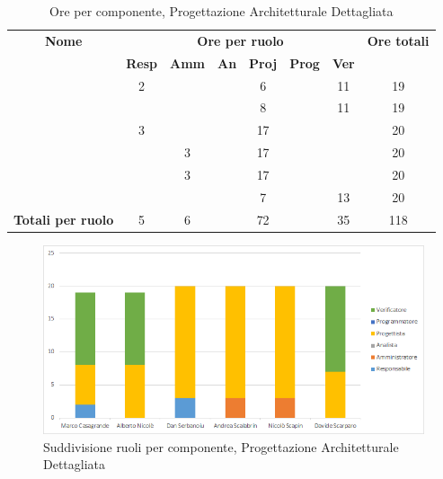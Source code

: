 \begin{table}[H]
	\begin{center}
		\begin{tabular}{|c|c|c|c|c|c|c|c|}
			\hline
			\textbf{Nome} & \multicolumn{6}{c|}{\textbf{Ore per ruolo}} & \textbf{Ore totali} \\\cline{2-7}
			& \textbf{Resp} & \textbf{Amm} & \textbf{An} & \textbf{Proj} & \textbf{Prog} & \textbf{Ver} & \\
			\hline
			\MC			&	2	&		&		&	6	&		&	11	&	19	\\
			\hline
			\AN			&		&		&		&	8	&   	&	11	& 	19	\\
			\hline
			\DAN		&	3	&		&		&	17	&		&		&	20	\\
			\hline
			\AS			&		&	3	&	 	&	17	&	 	& 		&	20	\\
			\hline
			\NS 		&		&	3	&		&	17	&		& 		&	20	\\
			\hline
			\DS			& 		&		&		&	7	&		&	13	&	20	\\
			\hline
			\textbf{Totali per ruolo}	& 	5	&	6	&		&  72	&		&	35	&	118	\\
			\hline
		\end{tabular}
	\end{center}
	\caption{Ore per componente, Progettazione Architetturale Dettagliata}
\end{table}

\begin{figure}[H]
	\centering
	\includegraphics[scale=0.6]{img/6-3.png}
	\caption{Suddivisione ruoli per componente, Progettazione Architetturale Dettagliata}
\end{figure}

